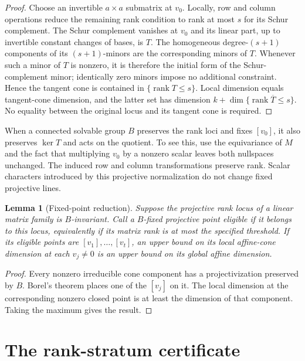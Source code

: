 \documentclass[11pt]{amsart}
\newtheorem{lemma}[theorem]{Lemma}
\theoremstyle{remark}
\newcommand{\rank}{\operatorname{rank}}
\begin{document}
\begin{proof}
Choose an invertible $a\times a$ submatrix at $v_0$. Locally, row and column operations reduce the remaining rank condition to rank at most $s$ for its Schur complement. The Schur complement vanishes at $v_0$ and its linear part, up to invertible constant changes of bases, is $T$. The homogeneous degree-$(s+1)$ components of its $(s+1)$-minors are the corresponding minors of $T$. Whenever such a minor of $T$ is nonzero, it is therefore the initial form of the Schur-complement minor; identically zero minors impose no additional constraint. Hence the tangent cone is contained in $\{\rank T\leq s\}$. Local dimension equals tangent-cone dimension, and the latter set has dimension $k+\dim\{\rank\overline T\leq s\}$. No equality between the original locus and its tangent cone is required.
\end{proof}

When a connected solvable group $B$ preserves the rank loci and fixes $[v_0]$, it also preserves $\ker T$ and acts on the quotient. To see this, use the equivariance of $M$ and the fact that multiplying $v_0$ by a nonzero scalar leaves both nullspaces unchanged. The induced row and column transformations preserve rank. Scalar characters introduced by this projective normalization do not change fixed projective lines.

\begin{lemma}[Fixed-point reduction]\label{lem:fixed}
Suppose the projective rank locus of a linear matrix family is $B$-invariant. Call a $B$-fixed projective point eligible if it belongs to this locus, equivalently if its matrix rank is at most the specified threshold. If its eligible points are $[v_1],\ldots,[v_t]$, an upper bound on its local affine-cone dimension at each $v_j\ne0$ is an upper bound on its global affine dimension.
\end{lemma}

\begin{proof}
Every nonzero irreducible cone component has a projectivization preserved by $B$. Borel's theorem places one of the $[v_j]$ on it. The local dimension at the corresponding nonzero closed point is at least the dimension of that component. Taking the maximum gives the result.
\end{proof}

\section{The rank-stratum certificate}\label{sec:rankproof}
\end{document}
